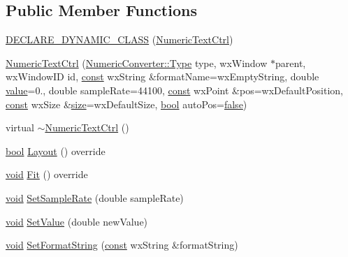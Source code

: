 \subsection*{Public Member Functions}
\begin{DoxyCompactItemize}
\item 
\hyperlink{class_numeric_text_ctrl_a6a7d3b0edcb7e9c121d4757769d9910d}{D\+E\+C\+L\+A\+R\+E\+\_\+\+D\+Y\+N\+A\+M\+I\+C\+\_\+\+C\+L\+A\+SS} (\hyperlink{class_numeric_text_ctrl}{Numeric\+Text\+Ctrl})
\item 
\hyperlink{class_numeric_text_ctrl_aafb8268af52c421bb0fd015d64d1757a}{Numeric\+Text\+Ctrl} (\hyperlink{class_numeric_converter_a2005a4bd0c2a9614868772e37fb9e2fb}{Numeric\+Converter\+::\+Type} type, wx\+Window $\ast$parent, wx\+Window\+ID id, \hyperlink{getopt1_8c_a2c212835823e3c54a8ab6d95c652660e}{const} wx\+String \&format\+Name=wx\+Empty\+String, double \hyperlink{lib_2expat_8h_a4a30a13b813682e68c5b689b45c65971}{value}=0., double sample\+Rate=44100, \hyperlink{getopt1_8c_a2c212835823e3c54a8ab6d95c652660e}{const} wx\+Point \&pos=wx\+Default\+Position, \hyperlink{getopt1_8c_a2c212835823e3c54a8ab6d95c652660e}{const} wx\+Size \&\hyperlink{group__lavu__mem_ga854352f53b148adc24983a58a1866d66}{size}=wx\+Default\+Size, \hyperlink{mac_2config_2i386_2lib-src_2libsoxr_2soxr-config_8h_abb452686968e48b67397da5f97445f5b}{bool} auto\+Pos=\hyperlink{mac_2config_2i386_2lib-src_2libsoxr_2soxr-config_8h_a65e9886d74aaee76545e83dd09011727}{false})
\item 
virtual \hyperlink{class_numeric_text_ctrl_a69411aaa1688afe5bacefa3448db4327}{$\sim$\+Numeric\+Text\+Ctrl} ()
\item 
\hyperlink{mac_2config_2i386_2lib-src_2libsoxr_2soxr-config_8h_abb452686968e48b67397da5f97445f5b}{bool} \hyperlink{class_numeric_text_ctrl_a6d07cb5c50f9f13878ab4eb8df379cde}{Layout} () override
\item 
\hyperlink{sound_8c_ae35f5844602719cf66324f4de2a658b3}{void} \hyperlink{class_numeric_text_ctrl_a1b079fbffe793d976d1a58885243e396}{Fit} () override
\item 
\hyperlink{sound_8c_ae35f5844602719cf66324f4de2a658b3}{void} \hyperlink{class_numeric_text_ctrl_a7fe1a03f83a91c1a9ffaf957b0b58bd6}{Set\+Sample\+Rate} (double sample\+Rate)
\item 
\hyperlink{sound_8c_ae35f5844602719cf66324f4de2a658b3}{void} \hyperlink{class_numeric_text_ctrl_aec5003fabb6f70d2a40a694adb3d29b4}{Set\+Value} (double new\+Value)
\item 
\hyperlink{sound_8c_ae35f5844602719cf66324f4de2a658b3}{void} \hyperlink{class_numeric_text_ctrl_a1a5c20cd62352fdfb701351515177463}{Set\+Format\+String} (\hyperlink{getopt1_8c_a2c212835823e3c54a8ab6d95c652660e}{const} wx\+String \&format\+String)

\end{DoxyCompactItemize}

